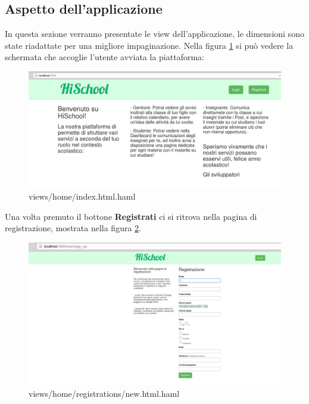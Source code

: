 \documentclass[Lau, binding=0.6cm, oneside]{sapthesis}
\begin{document}
\lstset{language=HAML, , captionpos=b, frame=single}


\lstset{language=CSS, , captionpos=b, frame=single}


\subsection{Aspetto dell'applicazione}
In questa sezione verranno presentate le view dell'applicazione, le dimensioni sono state riadattate per una migliore impaginazione. Nella figura \ref{fig:home_page} si può vedere la schermata che accoglie l'utente avviata la piattaforma:

\begin{figure}[H]
	\centering
	\includegraphics[width=1\linewidth]{images/home_page} 
	\caption{views/home/index.html.haml}
	\label{fig:home_page}
\end{figure}

Una volta premuto il bottone \textbf{Registrati} ci si ritrova nella pagina di registrazione, mostrata nella figura \ref{fig:registration_page}.

\begin{figure}[H]
	\centering
	\includegraphics[width=1\linewidth]{images/registration_page} 
	\caption{views/home/registrations/new.html.haml}
	\label{fig:registration_page}
\end{figure}
\end{document}
